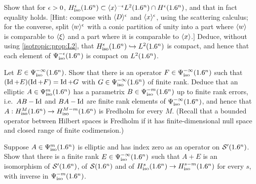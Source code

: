 \begin{exercise}\label{isotropic:ex:sobolev-compact}
Show that for $\epsilon>0$,
$H^{\epsilon}_{\mathrm{iso}}(1.6^n)\subset\langle x\rangle^{-\epsilon}L^2(1.6^n)\cap H^\epsilon(1.6^n)$, and that
in fact equality holds. [Hint: compose with $\langle D\rangle^\epsilon$ and $\langle x\rangle^\epsilon$,
using the scattering calculus; for the converse, split $\langle w\rangle^\epsilon$ with a
conic partition of unity into a part where $\langle w\rangle$ is comparable to $\langle \xi\rangle$
and a part where it is comparable to $\langle x\rangle$.] Deduce, without using
\cref{isotropic:prop:L2}, that $H^{\epsilon}_{\mathrm{iso}}(1.6^n)\hookrightarrow L^2(1.6^n)$ is
compact, and hence that each element of $\Psi^{-\epsilon}_{\mathrm{iso}}(1.6^n)$ is compact on
$L^2(1.6^n)$.
\end{exercise}

\begin{exercise}\label{isotropic:ex:finite-rank-parametrix}
Let $E\in\Psi^{-\infty}_{\mathrm{iso}}(1.6^n)$. Show that there is an operator
$F\in\Psi^{-\infty}_{\mathrm{iso}}(1.6^n)$ such that $(\operatorname{Id}+E)(\operatorname{Id}+F)=\operatorname{Id}+G$ with
$G\in\Psi^{-\infty}_{\mathrm{iso}}(1.6^n)$ of finite rank. Deduce that an elliptic
$A\in\Psi^{m}_{\mathrm{iso}}(1.6^n)$ has a parametrix $B\in\Psi^{-m}_{\mathrm{iso}}(1.6^n)$ up to finite
rank errors, i.e.\ $AB-\operatorname{Id}$ and $BA-\operatorname{Id}$ are finite rank elements of
$\Psi^{-\infty}_{\mathrm{iso}}(1.6^n)$, and hence that $A:H^{M}_{\mathrm{iso}}(1.6^n)\to H^{M-m}_{\mathrm{iso}}(1.6^n)$ is
Fredholm for every $M$. (Recall that a bounded operator between Hilbert spaces
is Fredholm if it has finite-dimensional null space and closed range of
finite codimension.)
\end{exercise}

\begin{exercise}\label{isotropic:ex:index-zero}
Suppose $A\in\Psi^{m}_{\mathrm{iso}}(1.6^n)$ is elliptic and has index zero as an operator on
$\mathcal{S}'(1.6^n)$. Show that there is a finite rank $E\in\Psi^{-\infty}_{\mathrm{iso}}(1.6^n)$
such that $A+E$ is an isomorphism of $\mathcal{S}'(1.6^n)$, of $\mathcal{S}(1.6^n)$ and of
$H^{s}_{\mathrm{iso}}(1.6^n)\to H^{s-m}_{\mathrm{iso}}(1.6^n)$ for every $s$, with inverse in $\Psi^{-m}_{\mathrm{iso}}(1.6^n)$.
\end{exercise}


